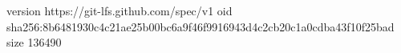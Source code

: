 version https://git-lfs.github.com/spec/v1
oid sha256:8b6481930c4c21ae25b00bc6a9f46f9916943d4c2cb20c1a0cdba43f10f25bad
size 136490

